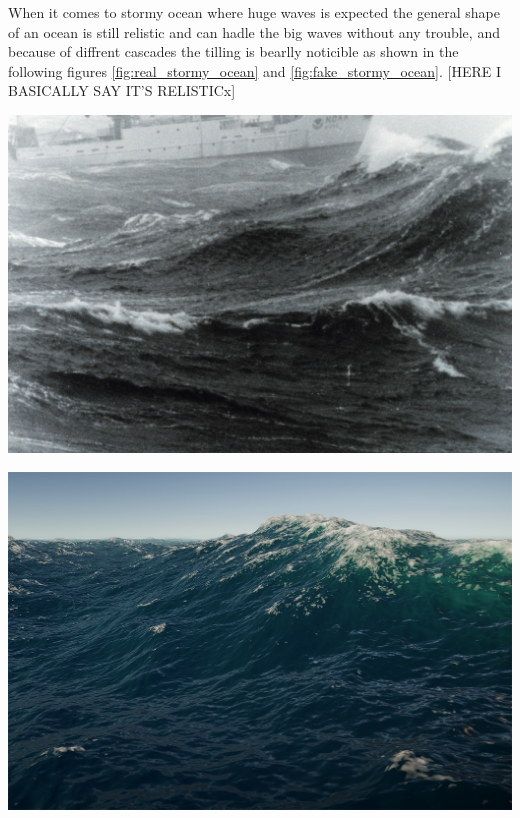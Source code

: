 When it comes to stormy ocean where huge waves is expected the general shape of an ocean is still relistic
and can hadle the big waves without any trouble, and because of diffrent cascades the tilling is bearlly noticible as shown in the following figures \ref{fig:real_stormy_ocean} and \ref{fig:fake_stormy_ocean}.
[HERE I BASICALLY SAY IT'S RELISTICx]

\begin{minipage}[t]{0.48\textwidth}
    \centering
    \includegraphics[width=1\textwidth]{"images/real_stormy_ocean.png"}
    \captionsetup{justification=centering}
    \label{fig:real_stormy_ocean}
\end{minipage}
\hfill
\begin{minipage}[t]{0.48\textwidth}
    \centering
    \includegraphics[width=1\textwidth]{"images/fake_stormy_ocean.png"}
    \label{fig:fake_stormy_ocean}
\end{minipage}

